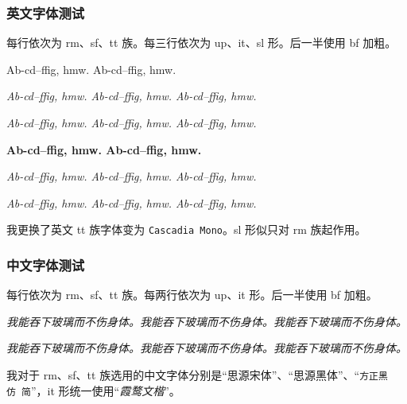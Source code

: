 \documentclass{../pkslide}
\begin{document}
\begin{frame}
  \frametitle{英文字体测试}
  每行依次为 rm、sf、tt 族。每三行依次为 up、it、sl 形。后一半使用 bf 加粗。
  
  {%
    { {\sffamily Ab-cd--ffig, hmw.} {\ttfamily Ab-cd--ffig, hmw.}}
    
    {\itshape {\rmfamily Ab-cd--ffig, hmw.} {\sffamily Ab-cd--ffig, hmw.} {\ttfamily Ab-cd--ffig, hmw.}}
    
    {\slshape {\rmfamily Ab-cd--ffig, hmw.} {\sffamily Ab-cd--ffig, hmw.} {\ttfamily Ab-cd--ffig, hmw.}}
  }%
  
  {\bfseries%
    { {\sffamily Ab-cd--ffig, hmw.} {\ttfamily Ab-cd--ffig, hmw.}}
    
    {\itshape {\rmfamily Ab-cd--ffig, hmw.} {\sffamily Ab-cd--ffig, hmw.} {\ttfamily Ab-cd--ffig, hmw.}}
    
    {\slshape {\rmfamily Ab-cd--ffig, hmw.} {\sffamily Ab-cd--ffig, hmw.} {\ttfamily Ab-cd--ffig, hmw.}}
  }%
  
  我更换了英文 tt 族字体变为 \texttt{Cascadia Mono}。sl 形似只对 rm 族起作用。
\end{frame}

\begin{frame}
  \frametitle{中文字体测试}
  每行依次为 rm、sf、tt 族。每两行依次为 up、it 形。后一半使用 bf 加粗。
  
  {%
    {}
    
    {\itshape {\rmfamily{}我能吞下玻璃而不伤身体。}{\sffamily{}我能吞下玻璃而不伤身体。}{\ttfamily{}我能吞下玻璃而不伤身体。}}
    
    {\bfseries%
      {}
      
      {\itshape {\rmfamily{}我能吞下玻璃而不伤身体。}{\sffamily{}我能吞下玻璃而不伤身体。}{\ttfamily{}我能吞下玻璃而不伤身体。}}
    }%
  }%
  
  我对于 rm、sf、tt 族选用的中文字体分别是“\textrm{思源宋体}”、“\textsf{思源黑体}”、“\texttt{方正黑仿\ 简}”，it 形统一使用“\textit{霞鹜文楷}”。
\end{frame}
\end{document}
